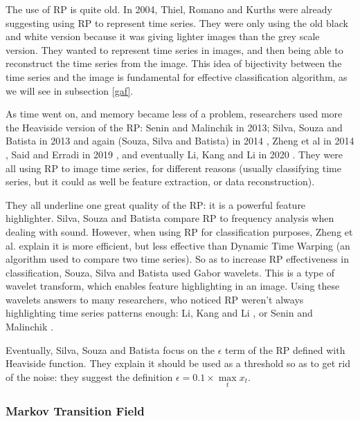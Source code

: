 \documentclass[11pt]{article}
\begin{document}
\begin{onehalfspace}
The use of RP is quite old. In 2004, Thiel, Romano and Kurths \cite{thiel} were already suggesting using RP to represent time series. They were only using the old black and white version because it was giving lighter images than the grey scale version. They wanted to represent time series in images, and then being able to reconstruct the time series from the image. This idea of bijectivity between the time series and the image is fundamental for effective classification algorithm, as we will see in subsection \ref{gaf}. 

As time went on, and memory became less of a problem, researchers used more the Heaviside version of the RP: Senin and Malinchik in 2013; Silva, Souza and Batista in 2013 \cite{silva} and again (Souza, Silva and Batista) in 2014 \cite{souza}, Zheng et al in 2014 \cite{zheng}, Said and Erradi in 2019 \cite{senin}, and eventually Li, Kang and Li in 2020 \cite{li}. They were all using RP to image time series, for different reasons (usually classifying time series, but it could as well be feature extraction, or data reconstruction).

They all underline one great quality of the RP: it is a powerful feature highlighter. Silva, Souza and Batista \cite{silva} compare RP to frequency analysis when dealing with sound. However, when using RP for classification purposes, Zheng et al. \cite{zheng} explain it is more efficient, but less effective than Dynamic Time Warping (an algorithm used to compare two time series). So as to increase RP effectiveness in classification, Souza, Silva and Batista \cite{souza} used Gabor wavelets. This is a type of wavelet transform, which enables feature highlighting in an image. Using these wavelets answers to many researchers, who noticed RP weren't always highlighting time series patterns enough: Li, Kang and Li \cite{li}, or Senin and Malinchik \cite{senin}. 

Eventually, Silva, Souza and Batista \cite{silva} focus on the $\epsilon$ term of the RP defined with Heaviside function. They explain it should be used as a threshold so as to get rid of the noise: they suggest the definition $\epsilon = 0.1 \times \max\limits_t x_t$.

\subsubsection{Markov Transition Field}


\end{onehalfspace}
\end{document}
